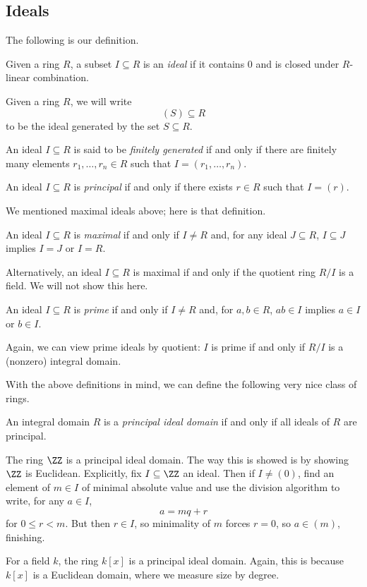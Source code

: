 \subsection{Ideals}
The following is our definition.
\begin{definition}[Ideal]
	Given a ring $R$, a subset $I\subseteq R$ is an \textit{ideal} if it contains $0$ and is closed under $R$-linear combination.
\end{definition}
Given a ring $R$, we will write
\[(S)\subseteq R\]
to be the ideal generated by the set $S\subseteq R$.
\begin{definition}
	An ideal $I\subseteq R$ is said to be \textit{finitely generated} if and only if there are finitely many elements $r_1,\ldots,r_n\in R$ such that $I=(r_1,\ldots,r_n)$.
\end{definition}
\begin{definition}[Principal]
	An ideal $I\subseteq R$ is \textit{principal} if and only if there exists $r\in R$ such that $I=(r)$.
\end{definition}
We mentioned maximal ideals above; here is that definition.
\begin{definition}[Maximal]
	An ideal $I\subseteq R$ is \textit{maximal} if and only if $I\ne R$ and, for any ideal $J\subseteq R$, $I\subseteq J$ implies $I=J$ or $I=R$.
\end{definition}
Alternatively, an ideal $I\subseteq R$ is maximal if and only if the quotient ring $R/I$ is a field. We will not show this here.
\begin{definition}[Prime]
	An ideal $I\subseteq R$ is \textit{prime} if and only if $I\ne R$ and, for $a,b\in R$, $ab\in I$ implies $a\in I$ or $b\in I$.
\end{definition}
Again, we can view prime ideals by quotient: $I$ is prime if and only if $R/I$ is a (nonzero) integral domain.

With the above definitions in mind, we can define the following very nice class of rings.
\begin{definition}
	An integral domain $R$ is a \textit{principal ideal domain} if and only if all ideals of $R$ are principal.
\end{definition}
\begin{example}
	The ring $\ZZ$ is a principal ideal domain. The way this is showed is by showing $\ZZ$ is Euclidean. Explicitly, fix $I\subseteq\ZZ$ an ideal. Then if $I\ne(0)$, find an element of $m\in I$ of minimal absolute value and use the division algorithm to write, for any $a\in I$,
	\[a=mq+r\]
	for $0\le r<m$. But then $r\in I$, so minimality of $m$ forces $r=0$, so $a\in(m)$, finishing.
\end{example}
\begin{example}
	For a field $k$, the ring $k[x]$ is a principal ideal domain. Again, this is because $k[x]$ is a Euclidean domain, where we measure size by degree.
\end{example}


